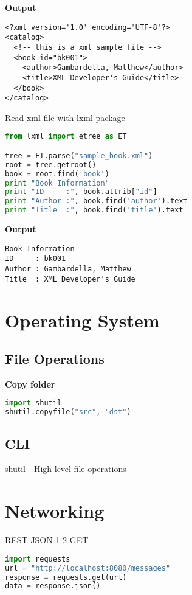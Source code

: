 \textbf{Output}

\begin{lstlisting}
<?xml version='1.0' encoding='UTF-8'?>
<catalog>
  <!-- this is a xml sample file -->
  <book id="bk001">
    <author>Gambardella, Matthew</author>
    <title>XML Developer's Guide</title>
  </book>
</catalog>
\end{lstlisting}


Read xml file with lxml package

\begin{lstlisting}[language=Python]
from lxml import etree as ET

tree = ET.parse("sample_book.xml")
root = tree.getroot()
book = root.find('book')
print "Book Information"
print "ID     :", book.attrib["id"]
print "Author :", book.find('author').text
print "Title  :", book.find('title').text
\end{lstlisting}

\textbf{Output}

\begin{lstlisting}
Book Information
ID     : bk001
Author : Gambardella, Matthew
Title  : XML Developer's Guide
\end{lstlisting}

\section{Operating System}

\subsection{File Operations}

\textbf{Copy folder}

\begin{lstlisting}[language=Python]
import shutil
shutil.copyfile("src", "dst")
\end{lstlisting}


\subsection{CLI}

shutil - High-level file operations

\section{Networking}


REST
JSON 1 2
GET

\begin{lstlisting}[language=Python]
import requests
url = "http://localhost:8080/messages"
response = requests.get(url)
data = response.json()
\end{lstlisting}

